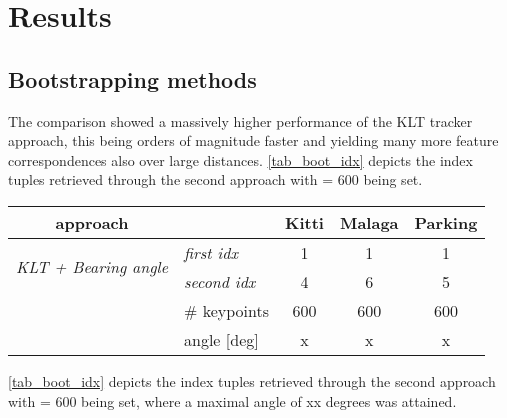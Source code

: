 \section{Results}

\subsection{Bootstrapping methods}
The comparison showed a massively higher performance of the KLT tracker approach, this being orders of magnitude faster and yielding many more feature correspondences also over large distances. \cref{tab_boot_idx} depicts the index tuples retrieved through the second approach with  = $600$ being set.
\begin{center}
	\begin{tabular}{ c | l | c  c  c }
		approach &				 &				Kitti &		Malaga &	Parking\\
  		\hline
 \multirow{2}{*}{\textit{KLT + Bearing angle}} &	\textit{first idx} &	1 & 		1 & 		1\\
  		 & 						\textit{second idx} &	4 & 		6 & 		5\\
  		& 						\# keypoints & 				600 & 		600 & 		600\\
  		&						angle [deg] & 				x &			x &			x\\
  		\hline
	\end{tabular}
	\label{tab_boot_idx}
\end{center}
\cref{tab_boot_idx} depicts the index tuples retrieved through the second approach with  = $600$ being set, where a maximal angle of xx degrees was attained.\\

